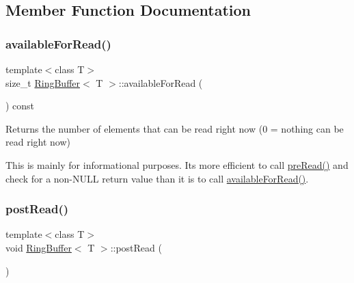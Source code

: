 \subsection{Member Function Documentation}
\mbox{\label{class_ring_buffer_a2d77169348cd228b343ba2245e1ce371}} 
\subsubsection{\texorpdfstring{available\+For\+Read()}{availableForRead()}}
{\footnotesize\ttfamily template$<$class T$>$ \\
size\+\_\+t \mbox{\hyperlink{class_ring_buffer}{Ring\+Buffer}}$<$ T $>$\+::available\+For\+Read (\begin{DoxyParamCaption}{ }\end{DoxyParamCaption}) const\hspace{0.3cm}{\ttfamily [inline]}}



Returns the number of elements that can be read right now (0 = nothing can be read right now) 

This is mainly for informational purposes. It\textquotesingle{}s more efficient to call \mbox{\hyperlink{class_ring_buffer_a724ce39b381489539fda406e06596a1d}{pre\+Read()}} and check for a non-\/\+N\+U\+LL return value than it is to call \mbox{\hyperlink{class_ring_buffer_a2d77169348cd228b343ba2245e1ce371}{available\+For\+Read()}}. \mbox{\label{class_ring_buffer_aad9eebd3dc4cc774666467de89c6de86}} 
\subsubsection{\texorpdfstring{post\+Read()}{postRead()}}
{\footnotesize\ttfamily template$<$class T$>$ \\
void \mbox{\hyperlink{class_ring_buffer}{Ring\+Buffer}}$<$ T $>$\+::post\+Read (\begin{DoxyParamCaption}{ }\end{DoxyParamCaption})\hspace{0.3cm}{\ttfamily [inline]}}



